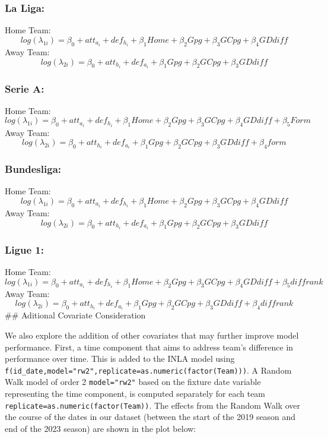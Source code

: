 \documentclass[
]{article}
\begin{document}
\hypertarget{la-liga}{%
\subsubsection{La Liga:}\label{la-liga}}

Home Team:
\[log(\lambda_{1i}) = \beta_0 +  att_{a_i} + def_{h_i} +  \beta_1 Home + \beta_2 Gpg + \beta_3 GCpg + \beta_4 GDdiff\]
Away Team:
\[log(\lambda_{2i}) = \beta_0 +  att_{h_i} + def_{a_i} + \beta_1 Gpg + \beta_2 GCpg +  \beta_3 GDdiff\]

\hypertarget{serie-a}{%
\subsubsection{Serie A:}\label{serie-a}}

Home Team:
\[log(\lambda_{1i}) = \beta_0 +  att_{a_i} + def_{h_i} +  \beta_1 Home + \beta_2 Gpg + \beta_3 GCpg + \beta_4 GDdiff + \beta_5 Form\]
Away Team:
\[log(\lambda_{2i}) = \beta_0 +  att_{h_i} + def_{a_i} + \beta_1 Gpg + \beta_2 GCpg +  \beta_3 GDdiff + \beta_4 form\]

\hypertarget{bundesliga}{%
\subsubsection{Bundesliga:}\label{bundesliga}}

Home Team:
\[log(\lambda_{1i}) = \beta_0 +  att_{a_i} + def_{h_i} +  \beta_1 Home + \beta_2 Gpg + \beta_3 GCpg + \beta_4 GDdiff\]
Away Team:
\[log(\lambda_{2i}) = \beta_0 +  att_{h_i} + def_{a_i} + \beta_1 Gpg + \beta_2 GCpg +  \beta_3 GDdiff\]

\hypertarget{ligue-1}{%
\subsubsection{Ligue 1:}\label{ligue-1}}

Home Team:
\[log(\lambda_{1i}) = \beta_0 +  att_{a_i} + def_{h_i} +  \beta_1 Home + \beta_2 Gpg + \beta_3 GCpg + \beta_4 GDdiff + \beta_5 diffrank\]
Away Team:
\[log(\lambda_{2i}) = \beta_0 +  att_{h_i} + def_{a_i} + \beta_1 Gpg + \beta_2 GCpg +  \beta_3 GDdiff + \beta_4 diffrank\]
\#\# Aditional Covariate Consideration

We also explore the addition of other covariates that may further
improve model performance. First, a time component that aims to address
team's difference in performance over time. This is added to the INLA
model using
\texttt{f(id\_date,model="rw2",replicate=as.numeric(factor(Team)))}. A
Random Walk model of order 2 \texttt{model="rw2"} based on the fixture
date variable representing the time component, is computed separately
for each team \texttt{replicate=as.numeric(factor(Team))}. The effects
from the Random Walk over the course of the dates in our dataset
(between the start of the 2019 season and end of the 2023 season) are
shown in the plot below:
\end{document}
